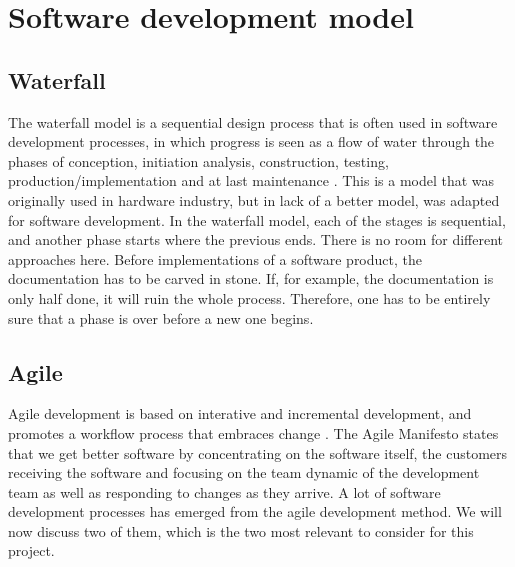 \section{Software development model}

\subsection{Waterfall}
The waterfall model is a sequential design process that is often used in software development processes, in which progress is seen as a flow of water through the phases of conception, initiation analysis, construction, testing, production/implementation and at last maintenance \cite{bib:waterfall}. 
\newline
\newline
This is a model that was originally used in hardware industry, but in lack of a better model, was adapted for software development. In the waterfall model, each of the stages is sequential, and another phase starts where the previous ends. There is no room for different approaches here. Before implementations of a software product, the documentation has to be carved in stone. If, for example, the documentation is only half done, it will ruin the whole process. Therefore, one has to be entirely sure that a phase is over before a new one begins. 

\subsection{Agile}
Agile development is based on interative and incremental development, and promotes a workflow process that embraces change \cite{bib:agile}. The Agile Manifesto states that we get better software by concentrating on the software itself, the customers receiving the software and focusing on the team dynamic of the development team as well as responding to changes as they arrive. A lot of software development processes has emerged from the agile development method. We will now discuss two of them, which is the two most relevant to consider for this project. 

